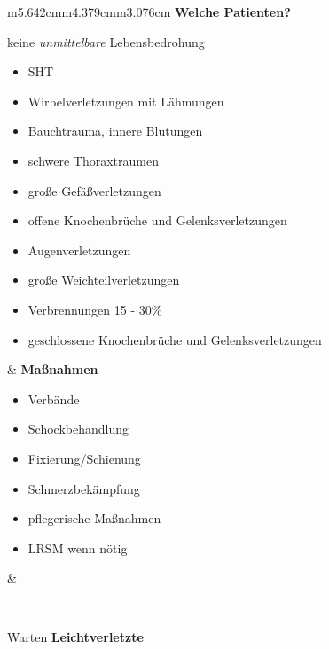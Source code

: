 \documentclass{article}
\newcommand\gEs[1]{\textbf{\textcolor[rgb]{0.0,0.0,0.5019608}{#1}}}
\newcommand\gEs[1]{\textbf{\textcolor[rgb]{0.0,0.0,0.5019608}{#1}}}
\newcommand\gE[1]{\textit{#1}}
\begin{document}
\begin{flushleft}
\tablehead{}\begin{supertabular}{m{5.642cm}m{4.379cm}m{3.076cm}}
{\mdseries \gEs{Welche Patienten?}}

keine \gE{unmittelbare} Lebensbedrohung

\begin{itemize}
\item {\mdseries SHT}

\item {\mdseries Wirbelverletzungen mit L\"ahmungen}

\item {\mdseries Bauchtrauma, innere Blutungen}

\item {\mdseries schwere Thoraxtraumen}

\item {\mdseries gro{\ss}e Gef\"a{\ss}verletzungen}

\item {\mdseries offene Knochenbr\"uche und  Gelenks\-verletzungen}

\item {\mdseries Augenverletzungen}

\item {\mdseries gro{\ss}e Weichteilverletzungen}

\item {\mdseries Verbrennungen 15 - 30\%}

\item {\mdseries geschlossene Knochenbr\"uche und
Gelenks\-ver\-letzungen}

\end{itemize}
 &
{\mdseries \gEs{Ma{\ss}nahmen}}

\begin{itemize}
\item {\mdseries Verb\"ande}

\item {\mdseries Schockbehandlung}

\item {\mdseries Fixierung/Schienung}

\item {\mdseries Schmerzbek\"ampfung}

\item {\mdseries pflegerische Ma{\ss}nahmen}

\item {\mdseries LRSM wenn n\"otig}

\end{itemize}
 &
{%
 \par}

\\
\end{supertabular}
\end{flushleft}
{\mdseries\color{black}
Warten \gEs{Leichtverletzte}}
\end{document}
